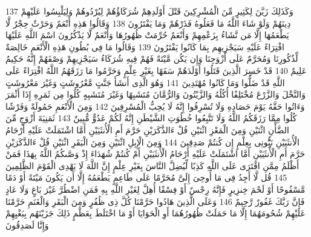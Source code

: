 {\tiny\colorbox{cl_aya}{137}} وَكَذَلِكَ زَيَّنَ لِكَثِيرٍ مِّنَ الْمُشْرِكِينَ قَتْلَ أَوْلَدِهِمْ شُرَكَاؤُهُمْ لِيُرْدُوهُمْ وَلِيَلْبِسُوا عَلَيْهِمْ دِينَهُمْ وَلَوْ شَاءَ اللَّهُ مَا فَعَلُوهُ فَذَرْهُمْ وَمَا يَفْتَرُونَ
{\tiny\colorbox{cl_aya}{138}} وَقَالُوا هَذِهِ أَنْعَمٌ وَحَرْثٌ حِجْرٌ لَّا يَطْعَمُهَا إِلَّا مَن نَّشَاءُ بِزَعْمِهِمْ وَأَنْعَمٌ حُرِّمَتْ ظُهُورُهَا وَأَنْعَمٌ لَّا يَذْكُرُونَ اسْمَ اللَّهِ عَلَيْهَا افْتِرَاءً عَلَيْهِ سَيَجْزِيهِم بِمَا كَانُوا يَفْتَرُونَ
{\tiny\colorbox{cl_aya}{139}} وَقَالُوا مَا فِى بُطُونِ هَذِهِ الْأَنْعَمِ خَالِصَةٌ لِّذُكُورِنَا وَمُحَرَّمٌ عَلَى أَزْوَجِنَا وَإِن يَكُن مَّيْتَةً فَهُمْ فِيهِ شُرَكَاءُ سَيَجْزِيهِمْ وَصْفَهُمْ إِنَّهُ حَكِيمٌ عَلِيمٌ
{\tiny\colorbox{cl_aya}{140}} قَدْ خَسِرَ الَّذِينَ قَتَلُوا أَوْلَدَهُمْ سَفَهًا بِغَيْرِ عِلْمٍ وَحَرَّمُوا مَا رَزَقَهُمُ اللَّهُ افْتِرَاءً عَلَى اللَّهِ قَدْ ضَلُّوا وَمَا كَانُوا مُهْتَدِينَ
{\tiny\colorbox{cl_aya}{141}} وَهُوَ الَّذِى أَنشَأَ جَنَّتٍ مَّعْرُوشَتٍ وَغَيْرَ مَعْرُوشَتٍ وَالنَّخْلَ وَالزَّرْعَ مُخْتَلِفًا أُكُلُهُ وَالزَّيْتُونَ وَالرُّمَّانَ مُتَشَبِهًا وَغَيْرَ مُتَشَبِهٍ كُلُوا مِن ثَمَرِهِ إِذَا أَثْمَرَ وَءَاتُوا حَقَّهُ يَوْمَ حَصَادِهِ وَلَا تُسْرِفُوا إِنَّهُ لَا يُحِبُّ الْمُسْرِفِينَ
{\tiny\colorbox{cl_aya}{142}} وَمِنَ الْأَنْعَمِ حَمُولَةً وَفَرْشًا كُلُوا مِمَّا رَزَقَكُمُ اللَّهُ وَلَا تَتَّبِعُوا خُطُوَتِ الشَّيْطَنِ إِنَّهُ لَكُمْ عَدُوٌّ مُّبِينٌ
{\tiny\colorbox{cl_aya}{143}} ثَمَنِيَةَ أَزْوَجٍ مِّنَ الضَّأْنِ اثْنَيْنِ وَمِنَ الْمَعْزِ اثْنَيْنِ قُلْ ءَالذَّكَرَيْنِ حَرَّمَ أَمِ الْأُنثَيَيْنِ أَمَّا اشْتَمَلَتْ عَلَيْهِ أَرْحَامُ الْأُنثَيَيْنِ نَبُِّٔونِى بِعِلْمٍ إِن كُنتُمْ صَدِقِينَ
{\tiny\colorbox{cl_aya}{144}} وَمِنَ الْإِبِلِ اثْنَيْنِ وَمِنَ الْبَقَرِ اثْنَيْنِ قُلْ ءَالذَّكَرَيْنِ حَرَّمَ أَمِ الْأُنثَيَيْنِ أَمَّا اشْتَمَلَتْ عَلَيْهِ أَرْحَامُ الْأُنثَيَيْنِ أَمْ كُنتُمْ شُهَدَاءَ إِذْ وَصَّىكُمُ اللَّهُ بِهَذَا فَمَنْ أَظْلَمُ مِمَّنِ افْتَرَى عَلَى اللَّهِ كَذِبًا لِّيُضِلَّ النَّاسَ بِغَيْرِ عِلْمٍ إِنَّ اللَّهَ لَا يَهْدِى الْقَوْمَ الظَّلِمِينَ
{\tiny\colorbox{cl_aya}{145}} قُل لَّا أَجِدُ فِى مَا أُوحِىَ إِلَىَّ مُحَرَّمًا عَلَى طَاعِمٍ يَطْعَمُهُ إِلَّا أَن يَكُونَ مَيْتَةً أَوْ دَمًا مَّسْفُوحًا أَوْ لَحْمَ خِنزِيرٍ فَإِنَّهُ رِجْسٌ أَوْ فِسْقًا أُهِلَّ لِغَيْرِ اللَّهِ بِهِ فَمَنِ اضْطُرَّ غَيْرَ بَاغٍ وَلَا عَادٍ فَإِنَّ رَبَّكَ غَفُورٌ رَّحِيمٌ
{\tiny\colorbox{cl_aya}{146}} وَعَلَى الَّذِينَ هَادُوا حَرَّمْنَا كُلَّ ذِى ظُفُرٍ وَمِنَ الْبَقَرِ وَالْغَنَمِ حَرَّمْنَا عَلَيْهِمْ شُحُومَهُمَا إِلَّا مَا حَمَلَتْ ظُهُورُهُمَا أَوِ الْحَوَايَا أَوْ مَا اخْتَلَطَ بِعَظْمٍ ذَلِكَ جَزَيْنَهُم بِبَغْيِهِمْ وَإِنَّا لَصَدِقُونَ
